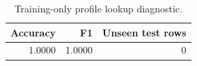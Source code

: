 \begin{table}[H]
\centering\small
\caption{Training-only profile lookup diagnostic.}
\begin{tabular}{rrr}
\toprule
Accuracy & F1 & Unseen test rows \\
\midrule
1.0000 & 1.0000 & 0 \\
\bottomrule
\end{tabular}
\end{table}
